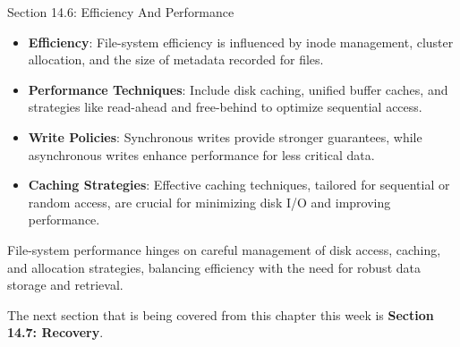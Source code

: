 \begin{notes}{Section 14.6: Efficiency And Performance}
\begin{highlight}
        \begin{itemize}
            \item \textbf{Efficiency}: File-system efficiency is influenced by inode management, cluster allocation, and the size of metadata recorded for files.
            \item \textbf{Performance Techniques}: Include disk caching, unified buffer caches, and strategies like read-ahead and free-behind to optimize sequential access.
            \item \textbf{Write Policies}: Synchronous writes provide stronger guarantees, while asynchronous writes enhance performance for less critical data.
            \item \textbf{Caching Strategies}: Effective caching techniques, tailored for sequential or random access, are crucial for minimizing disk I/O and improving performance.
        \end{itemize}
    
    File-system performance hinges on careful management of disk access, caching, and allocation strategies, balancing efficiency with the need for robust data storage and retrieval.
    
    \end{highlight}
\end{notes}

The next section that is being covered from this chapter this week is \textbf{Section 14.7: Recovery}.

